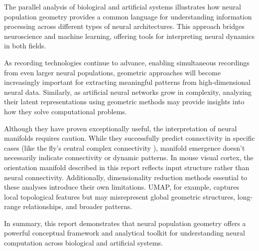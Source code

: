 \documentclass[11pt,a4paper]{article}
\begin{document}
The parallel analysis of biological and artificial systems illustrates how neural population geometry provides a common language for understanding information processing across different types of neural architectures. This approach bridges neuroscience and machine learning, offering tools for interpreting neural dynamics in both fields.

As recording technologies continue to advance, enabling simultaneous recordings from even larger neural populations, geometric approaches will become increasingly important for extracting meaningful patterns from high-dimensional neural data. Similarly, as artificial neural networks grow in complexity, analyzing their latent representations using geometric methods may provide insights into how they solve computational problems.

Although they have proven exceptionally useful, the interpretation of neural manifolds requires caution. While they successfully predict connectivity in specific cases (like the fly's central complex connectivity \cite{kim2017ring}), manifold emergence doesn't necessarily indicate connectivity or dynamic patterns. In mouse visual cortex, the orientation manifold described in this report reflects input structure rather than neural connectivity.
Additionally, dimensionality reduction methods essential to these analyses introduce their own limitations. UMAP, for example, captures local topological features but may misrepresent global geometric structures, long-range relationships, and broader patterns. \cite{diaz2021review}

In summary, this report demonstrates that neural population geometry offers a powerful conceptual framework and analytical toolkit for understanding neural computation across biological and artificial systems.


\end{document}
